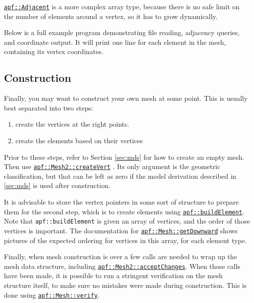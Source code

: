 \documentclass{article}
\begin{document}
\href{http://scorec.rpi.edu/~dibanez/core/namespaceapf.html#a12d882b4789bf98322cbe6f02c91b1f8}{\texttt{apf::Adjacent}} is a more complex array type,
because there is no safe limit on the number of elements around
a vertex, so it has to grow dynamically.

Below is a full example program demonstrating file reading,
adjacency queries, and coordinate output.
It will print one line for each element in the mesh,
containing its vertex coordinates.



\subsection{Construction}
\label{sec:gen}

Finally, you may want to construct your own mesh at
some point.
This is usually best separated into two steps:
\begin{enumerate}
\item create the vertices at the right points.
\item create the elements based on their vertices
\end{enumerate}

Prior to these steps, refer to Section \ref{sec:mds} for
how to create an empty mesh.
Then use
\href{http://scorec.rpi.edu/~dibanez/core/classapf_1_1Mesh2.html#ae7a58e9d51c9a683506d83e69416482d}{\texttt{apf::Mesh2::createVert}}
.
Its only argument is the geometric classification, but
that can be left as zero if the model derivation described
in \ref{sec:mds} is used after construction.

It is advisable to store the vertex pointers in some sort
of structure to prepare them for the second step,
which is to create elements using
\href{http://scorec.rpi.edu/~dibanez/core/namespaceapf.html#ae4a6608901d851a5d760bef899ca8e4a}{\texttt{apf::buildElement}}.
Note that \texttt{apf::buildElement} is given an array
of vertices, and the order of those vertices is important.
The documentation for
\href{http://scorec.rpi.edu/~dibanez/core/classapf_1_1Mesh.html#ae9af2075129ffd4553092049d85b276b}{\texttt{apf::Mesh::getDownward}}
shows pictures of the expected ordering for vertices
in this array, for each element type.

Finally, when mesh construction is over a few calls are
needed to wrap up the mesh data structure, including
\href{http://scorec.rpi.edu/~dibanez/core/classapf_1_1Mesh2.html#a87d3e1594f409859553bc285686009b4}{\texttt{apf::Mesh2::acceptChanges}}.
When those calls have been made, it is possible to run
a stringent verification on the mesh structure itself,
to make sure no mistakes were made during construction.
This is done using
\href{http://scorec.rpi.edu/~dibanez/core/classapf_1_1Mesh.html#a581c9102d05ed9399242e77e9fa96839}{\texttt{apf::Mesh::verify}}.
\end{document}
